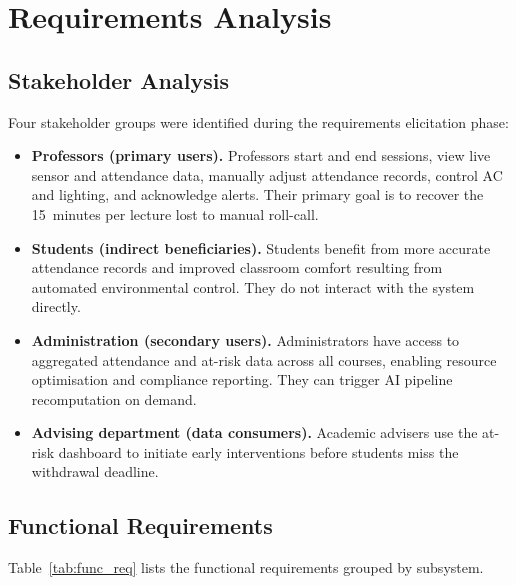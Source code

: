\section{Requirements Analysis}
\label{sec:requirements}

\subsection{Stakeholder Analysis}
\label{subsec:stakeholders}

Four stakeholder groups were identified during the requirements elicitation
phase:

\begin{itemize}
  \item \textbf{Professors (primary users).}  Professors start and end
    sessions, view live sensor and attendance data, manually adjust
    attendance records, control AC and lighting, and acknowledge alerts.
    Their primary goal is to recover the 15~minutes per lecture lost to
    manual roll-call.

  \item \textbf{Students (indirect beneficiaries).}  Students benefit
    from more accurate attendance records and improved classroom comfort
    resulting from automated environmental control.  They do not
    interact with the system directly.

  \item \textbf{Administration (secondary users).}  Administrators have
    access to aggregated attendance and at-risk data across all courses,
    enabling resource optimisation and compliance reporting.  They can
    trigger AI pipeline recomputation on demand.

  \item \textbf{Advising department (data consumers).}  Academic advisers
    use the at-risk dashboard to initiate early interventions before
    students miss the withdrawal deadline.
\end{itemize}

\subsection{Functional Requirements}
\label{subsec:func_req}

Table~\ref{tab:func_req} lists the functional requirements grouped by
subsystem.

